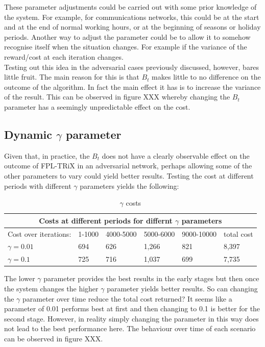 These parameter adjustments could be carried out with some prior knowledge of the system. For example, for communications networks, this could be at the start and at the end of normal working hours, or at the beginning of seasons or holiday periods. Another way to adjust the parameter could be to allow it to somehow recognise itself when the situation changes. For example if the variance of the reward/cost at each iteration changes.\\

Testing out this idea in the adversarial cases previously discussed, however, bares little fruit. The main reason for this is that $B_t$ makes little to no difference on the outcome of the algorithm. In fact the main effect it has is to increase the variance of the result. This can be observed in figure XXX whereby changing the $B_t$ parameter has a seemingly unpredictable effect on the cost.\\


\subsection{Dynamic $\gamma$ parameter}

Given that, in practice, the $B_t$ does not have a clearly observable effect on the outcome of FPL-TRiX in an adversarial network, perhaps allowing some of the other parameters to vary could yield better results. Testing the cost at different periods with different $\gamma$ parameters yields the following:\\

\begin{table}[h]
\begin{tabular}{ |p{3cm}||p{1.5cm}|p{1.5cm}|p{1.5cm}|p{1.5cm}|p{1.2cm}|  }
 \hline
 \multicolumn{6}{|c|}{Costs at different periods for differnt $\gamma$ parameters}  \\
 \hline
 Cost over  iterations:& 1-1000  & 4000-5000 & 5000-6000 & 9000-10000  & total cost  \\
 \hline
 $\gamma=0.01$        & 694     & 626       & 1,266     & 821         & 8,397       \\
 $\gamma=0.1$         & 725     & 716       & 1,037     & 699         & 7,735       \\
 \hline
\end{tabular}
\caption{$\gamma$ costs}
\end{table}

The lower $\gamma$ parameter provides the best results in the early stages but then once the system changes the higher $\gamma$ parameter yields better results. So can changing the $\gamma$ parameter over time reduce the total cost returned? It seems like a parameter of 0.01 performs best at first and then changing to 0.1 is better for the second stage. However, in reality simply changing the parameter in this way does not lead to the best performance here. The behaviour over time of each scenario can be observed in figure XXX.\\

